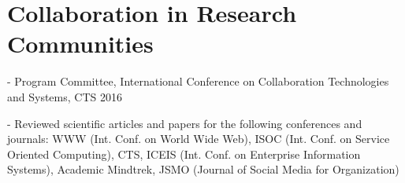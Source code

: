
\section{Collaboration in Research\\Communities}

- Program Committee, International Conference on Collaboration Technologies and Systems, CTS 2016

- Reviewed scientific articles and papers for the following conferences and journals: WWW (Int. Conf. on World Wide Web), ISOC (Int. Conf. on Service Oriented Computing), CTS, ICEIS (Int. Conf. on Enterprise Information Systems), Academic Mindtrek, JSMO (Journal of Social Media for Organization)